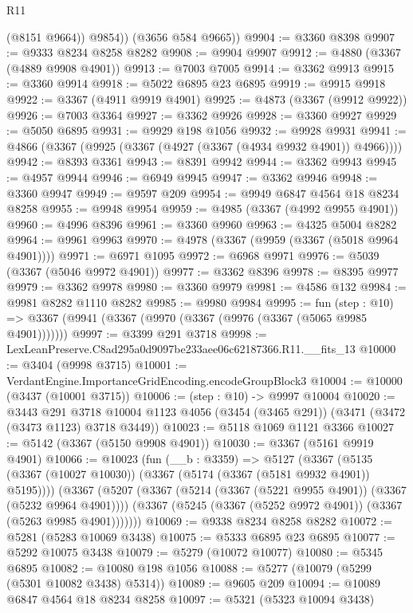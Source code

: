 \begin{lexlean}{R11}
\begin{coremodule}
            (@8151 @9664))
          @9854))
      (@3656 @584 @9665))
@9904 := @3360 @8398
@9907 := @9333 @8234 @8258 @8282
@9908 := @9904 @9907
@9912 := @4880 (@3367 (@4889 @9908 @4901))
@9913 := @7003 @7005
@9914 := @3362 @9913
@9915 := @3360 @9914
@9918 := @5022 @6895 @23 @6895
@9919 := @9915 @9918
@9922 := @3367 (@4911 @9919 @4901)
@9925 := @4873 (@3367 (@9912 @9922))
@9926 := @7003 @3364
@9927 := @3362 @9926
@9928 := @3360 @9927
@9929 := @5050 @6895
@9931 := @9929 @198 @1056
@9932 := @9928 @9931
@9941 := @4866 (@3367 (@9925 (@3367 (@4927 (@3367 (@4934 @9932 @4901)) @4966))))
@9942 := @8393 @3361
@9943 := @8391 @9942
@9944 := @3362 @9943
@9945 := @4957 @9944
@9946 := @6949 @9945
@9947 := @3362 @9946
@9948 := @3360 @9947
@9949 := @9597 @209
@9954 := @9949 @6847 @4564 @18 @8234 @8258
@9955 := @9948 @9954
@9959 := @4985 (@3367 (@4992 @9955 @4901))
@9960 := @4996 @8396
@9961 := @3360 @9960
@9963 := @4325 @5004 @8282
@9964 := @9961 @9963
@9970 := @4978 (@3367 (@9959 (@3367 (@5018 @9964 @4901))))
@9971 := @6971 @1095
@9972 := @6968 @9971
@9976 := @5039 (@3367 (@5046 @9972 @4901))
@9977 := @3362 @8396
@9978 := @8395 @9977
@9979 := @3362 @9978
@9980 := @3360 @9979
@9981 := @4586 @132
@9984 := @9981 @8282 @1110 @8282
@9985 := @9980 @9984
@9995 := fun (step : @10) =>
  @3367 (@9941 (@3367 (@9970 (@3367 (@9976 (@3367 (@5065 @9985 @4901)))))))
@9997 := @3399 @291 @3718
@9998 := LexLeanPreserve.C8ad295a0d9097be233aee06c62187366.R11.__fits_13
@10000 := @3404 (@9998 @3715)
@10001 := VerdantEngine.ImportanceGridEncoding.encodeGroupBlock3
@10004 := @10000 (@3437 (@10001 @3715))
@10006 := (step : @10) -> @9997 @10004
@10020 := @3443
    @291
    @3718
    @10004
    @1123
    @4056
    (@3454 (@3465 @291))
    (@3471 (@3472 (@3473 @1123) @3718 @3449))
@10023 := @5118 @1069 @1121 @3366
@10027 := @5142 (@3367 (@5150 @9908 @4901))
@10030 := @3367 (@5161 @9919 @4901)
@10066 := @10023
    (fun (__b : @3359) =>
    @5127
      (@3367 (@5135 (@3367 (@10027 @10030)) (@3367 (@5174 (@3367 (@5181 @9932 @4901)) @5195))))
      (@3367
        (@5207
          (@3367 (@5214 (@3367 (@5221 @9955 @4901)) (@3367 (@5232 @9964 @4901))))
          (@3367 (@5245 (@3367 (@5252 @9972 @4901)) (@3367 (@5263 @9985 @4901)))))))
@10069 := @9338 @8234 @8258 @8282
@10072 := @5281 (@5283 @10069 @3438)
@10075 := @5333 @6895 @23 @6895
@10077 := @5292 @10075 @3438
@10079 := @5279 (@10072 @10077)
@10080 := @5345 @6895
@10082 := @10080 @198 @1056
@10088 := @5277 (@10079 (@5299 (@5301 @10082 @3438) @5314))
@10089 := @9605 @209
@10094 := @10089 @6847 @4564 @18 @8234 @8258
@10097 := @5321 (@5323 @10094 @3438)

\end{coremodule}
\end{lexlean}
